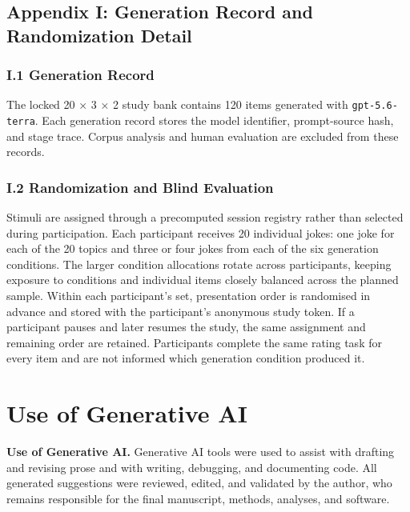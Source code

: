 \documentclass[11pt]{article}
\begin{document}
\subsection{Appendix I: Generation Record and Randomization Detail}\label{appendix-i-generation-record-and-randomization-detail}

\subsubsection{I.1 Generation Record}\label{i1-generation-record}

The locked 20 × 3 × 2 study bank contains 120 items generated with \texttt{gpt-5.6-terra}. Each generation record stores the model identifier, prompt-source hash, and stage trace. Corpus analysis and human evaluation are excluded from these records.

\subsubsection{I.2 Randomization and Blind Evaluation}\label{i2-randomization-and-blind-evaluation}

Stimuli are assigned through a precomputed session registry rather than selected during participation. Each participant receives 20 individual jokes: one joke for each of the 20 topics and three or four jokes from each of the six generation conditions. The larger condition allocations rotate across participants, keeping exposure to conditions and individual items closely balanced across the planned sample. Within each participant's set, presentation order is randomised in advance and stored with the participant's anonymous study token. If a participant pauses and later resumes the study, the same assignment and remaining order are retained. Participants complete the same rating task for every item and are not informed which generation condition produced it.

\section{Use of Generative AI}\label{use-of-generative-ai}

\textbf{Use of Generative AI.} Generative AI tools were used to assist with drafting and revising prose and with writing, debugging, and documenting code. All generated suggestions were reviewed, edited, and validated by the author, who remains responsible for the final manuscript, methods, analyses, and software.


\end{document}
